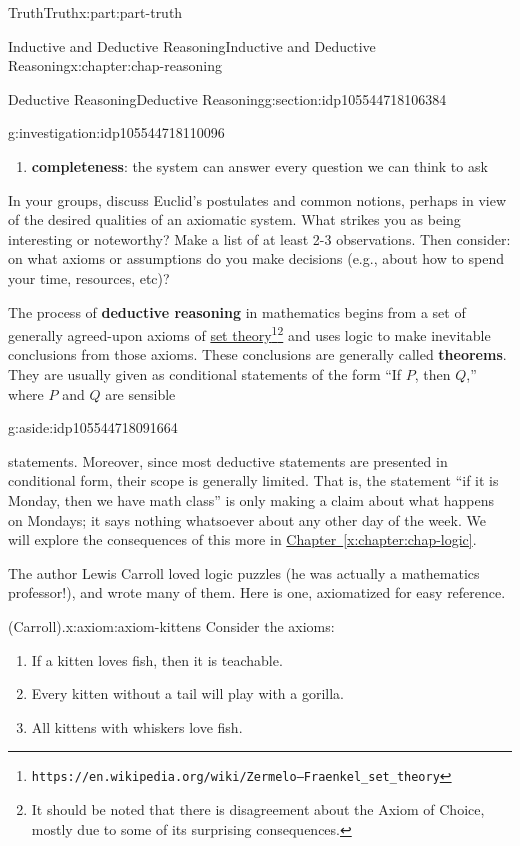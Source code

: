 \documentclass[oneside,10pt,]{book}
\newcommand{\xreffont}{\relax}
\newcommand{\terminology}[1]{\textbf{#1}}
\numberwithin{equation}{section}
\begin{document}
\begin{partptx}{Truth}{}{Truth}{}{}{x:part:part-truth}
\begin{chapterptx}{Inductive and Deductive Reasoning}{}{Inductive and Deductive Reasoning}{}{}{x:chapter:chap-reasoning}
\begin{sectionptx}{Deductive Reasoning}{}{Deductive Reasoning}{}{}{g:section:idp105544718106384}
\begin{investigation}{}{g:investigation:idp105544718110096}
\begin{enumerate}
\item{}\terminology{completeness}: the system can answer every question we can think to ask%
\end{enumerate}
In your groups, discuss Euclid's postulates and common notions, perhaps in view of the desired qualities of an axiomatic system. What strikes you as being interesting or noteworthy? Make a list of at least 2-3 observations. Then consider: on what axioms or assumptions do you make decisions (e.g., about how to spend your time, resources, etc)?%
\end{investigation}%
%
The process of \terminology{deductive reasoning} in mathematics begins from a set of generally agreed-upon axioms of \href{https://en.wikipedia.org/wiki/Zermelo–Fraenkel_set_theory}{set theory}\footnote{\nolinkurl{https://en.wikipedia.org/wiki/Zermelo–Fraenkel_set_theory}\label{g:fn:idp105544718088592}}\footnote{It should be noted that there is disagreement about the Axiom of Choice, mostly due to some of its surprising consequences.\label{g:fn:idp105544718088848}} and uses logic to make inevitable conclusions from those axioms. These conclusions are generally called \terminology{theorems}. They are usually given as conditional statements of the form ``If \(P\), then \(Q\),'' where \(P\) and \(Q\) are sensible\begin{aside}{}{g:aside:idp105544718091664}%
\end{aside}
 statements. Moreover, since most deductive statements are presented in conditional form, their scope is generally limited. That is, the statement ``if it is Monday, then we have math class'' is only making a claim about what happens on Mondays; it says nothing whatsoever about any other day of the week. We will explore the consequences of this more in \hyperref[x:chapter:chap-logic]{Chapter~{\xreffont\ref{x:chapter:chap-logic}}}.%
\par
The author Lewis Carroll loved logic puzzles (he was actually a mathematics professor!), and wrote many of them. Here is one, axiomatized for easy reference.%
\begin{axiom}{(Carroll).}{}{x:axiom:axiom-kittens}%
Consider the axioms:%
%
\begin{enumerate}
\item{}If a kitten loves fish, then it is teachable.%
\item{}Every kitten without a tail will play with a gorilla.%
\item{}All kittens with whiskers love fish.%

\end{enumerate}
\end{axiom}
\end{sectionptx}
\end{chapterptx}
\end{partptx}
\end{document}
